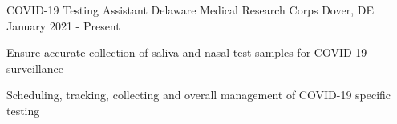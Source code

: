 

\begin{cventries}

  \cventry
    {COVID-19 Testing Assistant} %
    {Delaware Medical Research Corps} %
    {Dover, DE} %
    {January 2021 - Present} %
    {
      \begin{cvitems} %
        \item {Ensure accurate collection of saliva and nasal test samples for COVID-19 surveillance}
        \item {Scheduling, tracking, collecting and overall management of COVID-19 specific testing}
      \end{cvitems}
    }
\end{cventries}